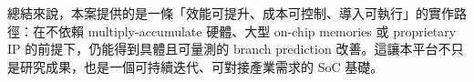 \documentclass[12pt,a4paper]{article}
\begin{document}
	總結來說，本案提供的是一條「效能可提升、成本可控制、導入可執行」的實作路徑：在不依賴 multiply-accumulate 硬體、大型 on-chip memories 或 proprietary IP 的前提下，仍能得到具體且可量測的 branch prediction 改善。這讓本平台不只是研究成果，也是一個可持續迭代、可對接產業需求的 SoC 基礎。

	\newpage
	\renewcommand{\refname}{參考資料}
	\nocite{*}
	
\end{document}
